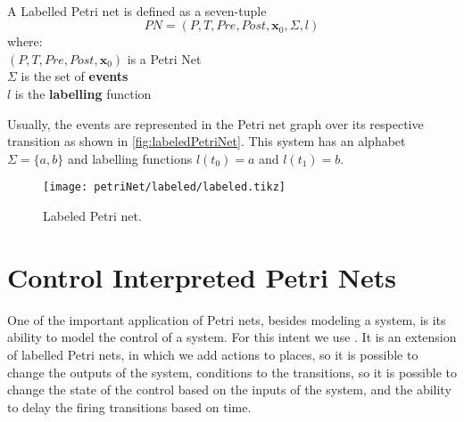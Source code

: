 \begin{definition}
  \label{def:petriNet}~\\
  A Labelled Petri net is defined as a seven-tuple
  \[PN = (P,T,Pre,Post,\mathbf{x}_0,\Sigma,l)\]
  where: \\
  \indent $(P,T,Pre,Post,\mathbf{x}_0)$ is a Petri Net\\
  \indent $\Sigma$ is the set of \textbf{events} \\
  \indent $l$ is the \textbf{labelling} function  \\
\end{definition}

Usually, the events are represented in the Petri net graph over its respective
transition as shown in \autoref{fig:labeledPetriNet}. This system has an alphabet
$\Sigma=\{a,b\}$ and labelling functions $l(t_0)=a$ and $l(t_1)=b$.

\begin{figure}[H]
  \centering
  \texttt{[image: petriNet/labeled/labeled.tikz]}
  \caption{Labeled Petri net.}
  \label{fig:labeledPetriNet}
\end{figure}

\section{Control Interpreted Petri Nets}
\label{sec:cipn}
One of the important application of Petri nets, besides modeling a system, is its
ability to model the control of a system. For this intent we use \CIPNs. It is an
extension of labelled Petri nets, in which we add actions to places, so it is
possible to change the outputs of the system, conditions to the transitions, so it
is possible to change the state of the control based on the inputs of the
system, and the ability to delay the firing transitions based on time.

